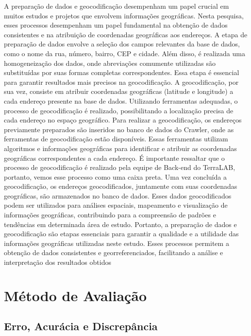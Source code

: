 A preparação de dados e geocodificação desempenham um papel crucial em muitos estudos e projetos que envolvem informações geográficas. Nesta pesquisa, esses processos desempenham um papel fundamental na obtenção de dados consistentes e na atribuição de coordenadas geográficas aos endereços.
A etapa de preparação de dados envolve a seleção dos campos relevantes da base de dados, como o nome da rua, número, bairro, CEP e cidade. Além disso, é realizada uma homogeneização dos dados, onde abreviações comumente utilizadas são substituídas por suas formas completas correspondentes. Essa etapa é essencial para garantir resultados mais precisos na geocodificação.
A geocodificação, por sua vez, consiste em atribuir coordenadas geográficas (latitude e longitude) a cada endereço presente na base de dados. Utilizando ferramentas adequadas, o processo de geocodificação é realizado, possibilitando a localização precisa de cada endereço no espaço geográfico.
Para realizar a geocodificação, os endereços previamente preparados são inseridos no banco de dados do Crawler, onde as ferramentas de geocodificação estão disponíveis. Essas ferramentas utilizam algoritmos e informações geográficas para identificar e atribuir as coordenadas geográficas correspondentes a cada endereço. É importante ressaltar que o processo de geocodificação é realizado pela equipe de Back-end do TerraLAB, portanto, vemos esse processo como uma caixa preta.
Uma vez concluída a geocodificação, os endereços geocodificados, juntamente com suas coordenadas geográficas, são armazenados no banco de dados. Esses dados geocodificados podem ser utilizados para análises espaciais, mapeamento e visualização de informações geográficas, contribuindo para a compreensão de padrões e tendências em determinada área de estudo.
Portanto, a preparação de dados e geocodificação são etapas essenciais para garantir a qualidade e a utilidade das informações geográficas utilizadas neste estudo. Esses processos permitem a obtenção de dados consistentes e georreferenciados, facilitando a análise e interpretação dos resultados obtidos

\section{Método de Avaliação}

\subsection{Erro, Acurácia e Discrepância}

